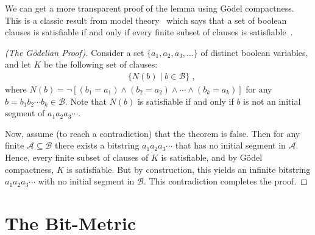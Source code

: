 \documentclass[12pt]{amsart}
\theoremstyle{plain}
\theoremstyle{definition}
\theoremstyle{remark}
\begin{document}
We can get a more transparent proof of the lemma using G\"odel
compactness. This is a classic result from model
theory~\cite{Kreisler:71} which says that a set of boolean clauses is
satisfiable if and only if every finite subset of clauses is
satisfiable~\cite{Goedel:30}.
\begin{proof}[(The G\"odelian Proof)]
Consider a set $\{a_1,a_2,a_3,\ldots\}$ of distinct boolean variables,
and let $K$ be the following set of clauses:
\begin{align*}
  &\{N(b) \mid b \in \mathcal{B}\}\;,
\end{align*}
where $N(b) = \neg\left[(b_1 = a_1) \wedge (b_2 = a_2) \wedge \cdots
\wedge (b_k =a_k)\right]$ for any $b = b_1b_2\cdots b_k \in
\mathcal{B}$.  Note that $N(b)$ is satisfiable if and only if $b$ is
not an initial segment of $a_1a_2a_3\cdots$.

Now, assume (to reach a contradiction) that the theorem is false.
Then for any finite $\mathcal{A}\subseteq\mathcal{B}$ there exists a
bitstring $a_1a_2a_3\cdots$ that has no initial segment in
$\mathcal{A}$.  Hence, every finite subset of clauses of $K$ is
satisfiable, and by G\"odel compactness, $K$ is satisfiable.  But by
construction, this yields an infinite bitstring $a_1a_2a_3\cdots$ with
no initial segment in $\mathcal{B}$. This contradiction completes the
proof.
\end{proof}


\section{The Bit-Metric}
\end{document}
